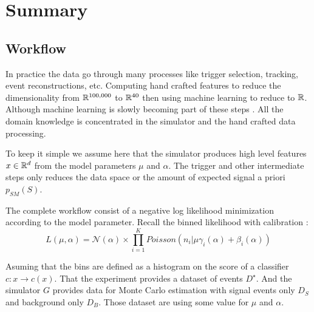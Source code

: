




\section{Summary} %
\label{sec:summary}


\subsection{Workflow} %
\label{sub:workflow}


In practice the data go through many processes like trigger selection, tracking, event reconstructions, etc.
Computing hand crafted features to reduce the dimensionality from $\mathbb{R}^{100,000}$ to $\mathbb{R}^{40}$ then using machine learning to reduce to $\mathbb{R}$.
Although machine learning is slowly becoming part of these steps \needcite.
All the domain knowledge is concentrated in the simulator and the hand crafted data processing.

To keep it simple we assume here that the simulator produces high level features $x \in \mathbb{R}^d$ from the model parameters $\mu$ and $\alpha$.
The trigger and other intermediate steps only reduces the data space or the amount of expected signal a priori $p_{SM}(S)$.

The complete workflow consist of a negative log likelihood minimization according to the model parameter.
Recall the binned likelihood with calibration :
\begin{equation}
  L(\mu, \alpha) =\mathcal N (\alpha) \times \prod_{i=1}^K Poisson(n_i | \mu \gamma_i(\alpha) + \beta_i(\alpha) )
\end{equation}

Asuming that the bins are defined as a histogram on the score of a classifier $c : x \to c(x)$.
That the experiment provides a dataset of events $D^\star$.
And the simulator $G$ provides data for Monte Carlo estimation with signal events only $D_S$ and background only $D_B$.
Those dataset are using some value for $\mu$ and $\alpha$.

